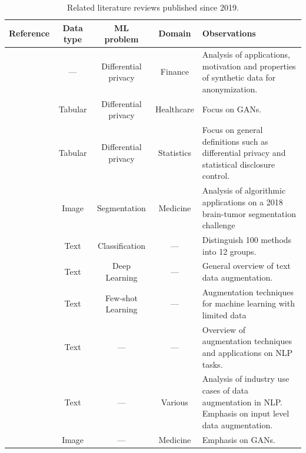 \documentclass[parskip=full]{scrartcl}
\begin{document}
\begin{table}[t!]
    \centering
    \caption{\label{tab:literature-reviews}
        Related literature reviews published since 2019.
    }
    \begin{tabularx}{\textwidth}{@{}rcccX@{}}
        \toprule
        Reference & Data type & ML problem & Domain & Observations \\
        \midrule

        \citet{assefa2020generating} & --- & Differential privacy &
        Finance & Analysis of applications, motivation and properties of
        synthetic data for anonymization. \\

        \citet{hernandez2022synthetic} & Tabular & Differential privacy &
        Healthcare & Focus on GANs. \\

        \citet{raghunathan2021synthetic} & Tabular & Differential privacy &
        Statistics & Focus on general definitions such as differential privacy
        and statistical disclosure control.\\

        \citet{nalepa2019data} & Image & Segmentation & Medicine & Analysis of
        algorithmic applications on a 2018 brain-tumor segmentation
        challenge\\

        \citet{bayer2021survey} & Text & Classification & --- & Distinguish
        100 methods into 12 groups. \\

        \citet{shorten2021text} & Text & Deep Learning & --- & General
        overview of text data augmentation. \\

        \citet{chen2021empirical} & Text & Few-shot Learning & --- &
        Augmentation techniques for machine learning with limited data\\

        \citet{feng2021survey} & Text & --- & --- & Overview of augmentation
        techniques and applications on NLP tasks.\\

        \citet{liu2020survey} & Text & --- & Various & Analysis of industry
        use cases of data augmentation in NLP\@. Emphasis on input level data
        augmentation.\\

        \citet{yi2019generative} & Image & --- & Medicine & Emphasis on GANs.\\


\end{tabularx}
\end{table}
\end{document}
